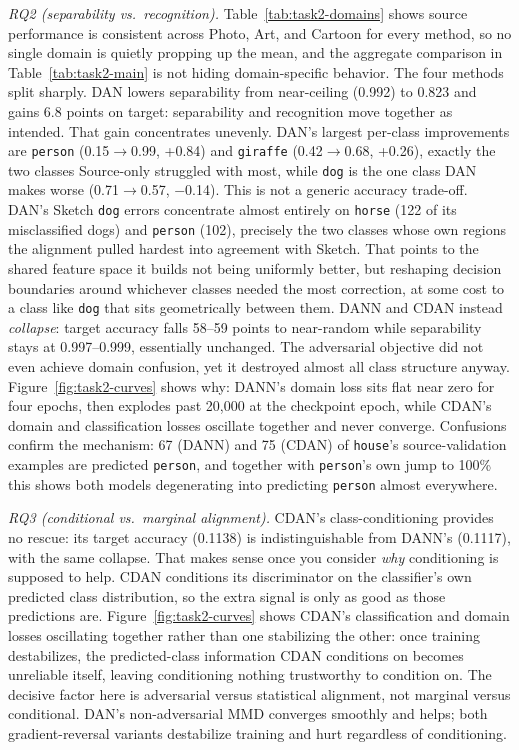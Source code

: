\documentclass{article}
\begin{document}
\emph{RQ2 (separability vs.\ recognition).} Table~\ref{tab:task2-domains} shows source performance
is consistent across Photo, Art, and Cartoon for every method, so no single domain is quietly
propping up the mean, and the aggregate comparison in Table~\ref{tab:task2-main} is not hiding
domain-specific behavior. The four methods split sharply. DAN lowers separability from
near-ceiling (0.992) to 0.823 and gains 6.8 points on target: separability and recognition move
together as intended. That gain concentrates unevenly. DAN's largest per-class improvements are
\texttt{person} (0.15$\to$0.99, +0.84) and \texttt{giraffe} (0.42$\to$0.68, +0.26), exactly the two
classes Source-only struggled with most, while \texttt{dog} is the one class DAN makes worse
(0.71$\to$0.57, $-$0.14). This is not a generic accuracy trade-off. DAN's Sketch \texttt{dog}
errors concentrate almost entirely on \texttt{horse} (122 of its misclassified dogs) and
\texttt{person} (102), precisely the two classes whose own regions the alignment pulled hardest
into agreement with Sketch. That points to the shared feature space it builds not being uniformly
better, but reshaping decision boundaries around whichever classes needed the most correction, at
some cost to a class like \texttt{dog} that sits geometrically between them. DANN and CDAN instead
\emph{collapse}: target accuracy falls 58--59 points to near-random while separability stays at
0.997--0.999, essentially unchanged. The adversarial objective did not even achieve domain
confusion, yet it destroyed almost all class structure anyway. Figure~\ref{fig:task2-curves} shows
why: DANN's domain loss sits flat near zero for four epochs, then explodes past 20{,}000 at the
checkpoint epoch, while CDAN's domain and classification losses oscillate together and never
converge. Confusions confirm the mechanism: 67 (DANN) and 75 (CDAN) of \texttt{house}'s
source-validation examples are predicted \texttt{person}, and together with \texttt{person}'s own
jump to 100\% this shows both models degenerating into predicting \texttt{person} almost
everywhere.

\emph{RQ3 (conditional vs.\ marginal alignment).} CDAN's class-conditioning provides no rescue: its
target accuracy (0.1138) is indistinguishable from DANN's (0.1117), with the same collapse. That
makes sense once you consider \emph{why} conditioning is supposed to help. CDAN conditions its
discriminator on the classifier's own predicted class distribution, so the extra signal is only as
good as those predictions are. Figure~\ref{fig:task2-curves} shows CDAN's classification and domain
losses oscillating together rather than one stabilizing the other: once training destabilizes, the
predicted-class information CDAN conditions on becomes unreliable itself, leaving conditioning
nothing trustworthy to condition on. The decisive factor here is adversarial versus statistical
alignment, not marginal versus conditional. DAN's non-adversarial MMD converges smoothly and helps;
both gradient-reversal variants destabilize training and hurt regardless of conditioning.
\end{document}
